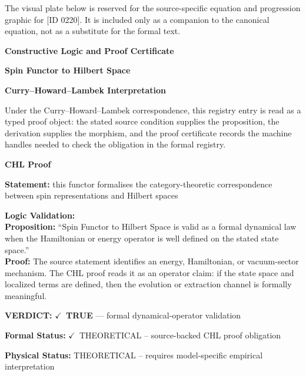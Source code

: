 \begingroup\footnotesize\sloppy
The visual plate below is reserved for the source-specific equation and progression graphic for [ID 0220]. It is included only as a companion to the canonical equation, not as a substitute for the formal text.
\par\endgroup
\ifTZPDarkEdition
{}
\fi

\clearpage
\begingroup\tzpsupportsetup
\noindent\textbf{\fontsize{10.8pt}{12.8pt}\selectfont [ID 0220] Constructive Logic and Proof Certificate}\par
\noindent\textbf{\fontsize{10pt}{12pt}\selectfont Spin Functor to Hilbert Space}\par
\vspace{0.45em}
\begingroup
\footnotesize
\setlength{\parskip}{0.22em}
\setlength{\parindent}{0pt}
\noindent\textbf{Curry--Howard--Lambek Interpretation}\par
Under the Curry--Howard--Lambek correspondence, this registry entry is read as a typed proof
object: the stated source condition supplies the proposition, the derivation supplies the
morphism, and the proof certificate records the machine handles needed to check the obligation
in the formal registry.

\vspace{0.45em}
\noindent\textbf{CHL Proof}\par
\textbf{Statement:} this functor formalises the category-theoretic correspondence between spin
representations and Hilbert spaces

\textbf{Logic Validation:}\\
\textbf{Proposition:} ``Spin Functor to Hilbert Space is valid as a formal dynamical law when the Hamiltonian or
energy operator is well defined on the stated state space.''\\
\textbf{Proof:} The source statement identifies an energy, Hamiltonian, or vacuum-sector mechanism. The
CHL proof reads it as an operator claim: if the state space and localized terms are
defined, then the evolution or extraction channel is formally meaningful.

\textbf{VERDICT:} \ensuremath{\checkmark}\ \textbf{TRUE} --- formal dynamical-operator validation

\textbf{Formal Status:} \ensuremath{\checkmark}\ THEORETICAL -- source-backed CHL proof obligation

\textbf{Physical Status:} THEORETICAL -- requires model-specific empirical interpretation
\par\vspace{0.45em}
\par
\ifTZPDarkEdition
{}
\fi
\endgroup
\endgroup
